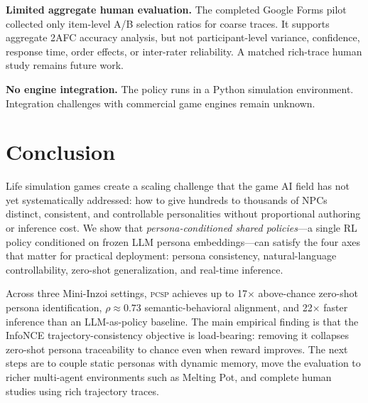 \documentclass[conference]{IEEEtran}
\newcommand{\PCSP}{\textsc{pcsp}\xspace}
\begin{document}
\textbf{Limited aggregate human evaluation.}
The completed Google Forms pilot collected only item-level A/B selection ratios
for coarse traces. It supports aggregate 2AFC accuracy analysis, but not
participant-level variance, confidence, response time, order effects, or
inter-rater reliability. A matched rich-trace human study remains future work.

\textbf{No engine integration.}
The policy runs in a Python simulation environment. Integration challenges with
commercial game engines remain unknown.

\section{Conclusion}
\label{sec:conclusion}

Life simulation games create a scaling challenge that the game AI field has not
yet systematically addressed: how to give hundreds to thousands of NPCs distinct,
consistent, and controllable personalities without proportional authoring or
inference cost. We show that \emph{persona-conditioned shared
policies}---a single RL policy conditioned on frozen LLM persona
embeddings---can satisfy the four axes that matter for practical deployment:
persona consistency, natural-language controllability, zero-shot
generalization, and real-time inference.

Across three Mini-Inzoi settings, \PCSP achieves up to 17$\times$ above-chance
zero-shot persona identification, $\rho\!\approx\!0.73$ semantic-behavioral
alignment, and 22$\times$ faster inference than an LLM-as-policy baseline.
The main empirical finding is that the InfoNCE trajectory-consistency objective
is load-bearing: removing it collapses zero-shot persona traceability to chance
even when reward improves. The next steps are to couple static personas with
dynamic memory, move the evaluation to richer multi-agent environments such as
Melting Pot, and complete human studies using rich trajectory traces.



\end{document}
